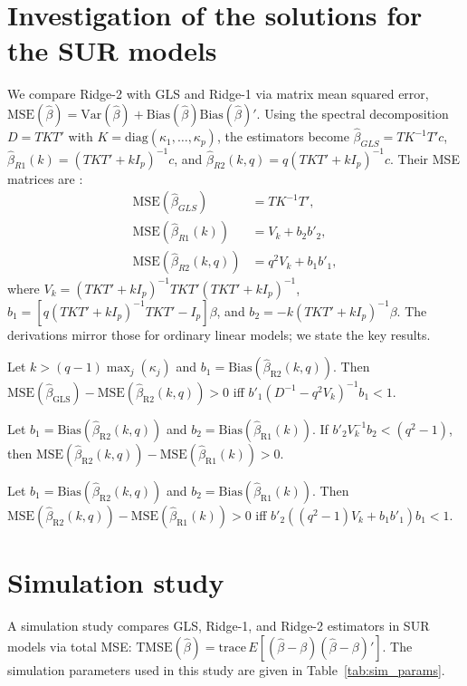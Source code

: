 \documentclass[twoside]{article}
\begin{document}
\section{Investigation of the solutions for the SUR models}

We compare Ridge-2 with GLS and Ridge-1 via matrix mean squared error, $\text{MSE}(\hat{\beta}) = \text{Var}(\hat{\beta}) + \text{Bias}(\hat{\beta})\text{Bias}(\hat{\beta})'$. Using the spectral decomposition $D = TKT'$ with $K = \text{diag}(\kappa_1, \ldots, \kappa_p)$, the estimators become $\hat{\beta}_{GLS} = TK^{-1}T'c$, $\hat{\beta}_{R1}(k) = (TKT' + kI_p)^{-1}c$, and $\hat{\beta}_{R2}(k, q) = q(TKT' + kI_p)^{-1}c$. Their MSE matrices are \cite{toker2013}:
\begin{align}
\text{MSE}(\hat{\beta}_{GLS}) &= TK^{-1}T', \\
\text{MSE}(\hat{\beta}_{R1}(k)) &= V_k + b_2 b'_2, \\
\text{MSE}(\hat{\beta}_{R2}(k, q)) &= q^2 V_k + b_1 b'_1,
\end{align}
where $V_k = (TKT' + kI_p)^{-1} TKT' (TKT' + kI_p)^{-1}$, $b_1 = [q(TKT' + kI_p)^{-1} TKT' - I_p]\beta$, and $b_2 = -k(TKT' + kI_p)^{-1}\beta$. The derivations mirror those for ordinary linear models; we state the key results.

\begin{lem}\label{lm1}
Let $k > (q - 1) \max_{j} (\kappa_j)$ and $b_1 = \text{Bias}(\hat{\beta}_{\text{R2}}(k, q))$. Then $\text{MSE}(\hat{\beta}_{\text{GLS}}) - \text{MSE}(\hat{\beta}_{\text{R2}}(k, q)) > 0$ iff $b'_1 (D^{-1} - q^2 V_k)^{-1} b_1 < 1$.
\end{lem}
\begin{lem}\label{lm2}
Let $b_1 = \text{Bias}(\hat{\beta}_{\text{R2}}(k, q))$ and $b_2 = \text{Bias}(\hat{\beta}_{\text{R1}}(k))$. If $b'_2 V_k^{-1} b_2 < (q^2 - 1)$, then $\text{MSE}(\hat{\beta}_{\text{R2}}(k, q)) - \text{MSE}(\hat{\beta}_{\text{R1}}(k)) > 0$.
\end{lem}
\begin{lem}\label{lm3}
Let $b_1 = \text{Bias}(\hat{\beta}_{\text{R2}}(k, q))$ and $b_2 = \text{Bias}(\hat{\beta}_{\text{R1}}(k))$. Then $\text{MSE}(\hat{\beta}_{\text{R2}}(k, q)) - \text{MSE}(\hat{\beta}_{\text{R1}}(k)) > 0$ iff $b'_2 ((q^2 - 1)V_k + b_1 b'_1) b_1 < 1$.
\end{lem}

\section{Simulation study}
A simulation study compares GLS, Ridge-1, and Ridge-2 estimators in SUR models via total MSE: $\text{TMSE}(\hat{\beta}) = \text{trace}\,E[(\hat{\beta} - \beta)(\hat{\beta} - \beta)']$. The simulation parameters used in this study are given in Table~\ref{tab:sim_params}.
\end{document}
